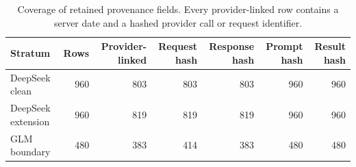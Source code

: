 
\begin{table}[H]
\centering
\caption{Coverage of retained provenance fields. Every provider-linked row contains a server date and a hashed provider call or request identifier.}
\label{tab:provider}
\small
\setlength{\tabcolsep}{4pt}
\begin{tabular}{@{}lrrrrrr@{}}
\toprule
Stratum & Rows & Provider-linked & Request hash & Response hash & Prompt hash & Result hash \\
\midrule
DeepSeek clean & 960 & 803 & 803 & 803 & 960 & 960 \\
DeepSeek extension & 960 & 819 & 819 & 819 & 960 & 960 \\
GLM boundary & 480 & 383 & 414 & 383 & 480 & 480 \\
\bottomrule
\end{tabular}
\end{table}
